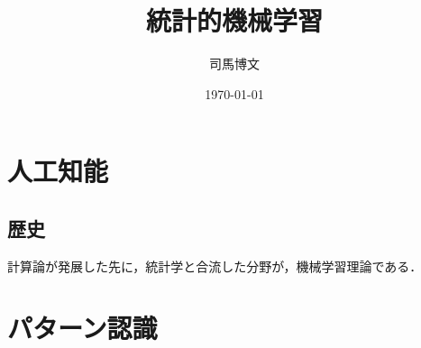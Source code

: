 \documentclass[uplatex,dvipdfmx]{jsreport}
\title{統計的機械学習}
\author{司馬博文}
\date{\today}
\begin{document}
\tableofcontents

\chapter{人工知能}

\section{歴史}

計算論が発展した先に，統計学と合流した分野が，機械学習理論である．

\begin{history}[第１次：記号処理と論理推論 (1960s)]
    
\end{history}

\begin{history}[第２次：エキスパートシステム (1980s)]
    
\end{history}

\chapter{パターン認識}
\end{document}
